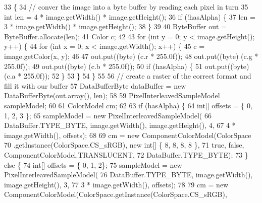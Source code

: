 \begin{DoxyCode}
33                                \{
34         \textcolor{comment}{// conver the image into a byte buffer by reading each pixel in turn}
35         \textcolor{keywordtype}{int} len = 4 * image.getWidth() * image.getHeight();
36         \textcolor{keywordflow}{if} (!hasAlpha) \{
37             len = 3 * image.getWidth() * image.getHeight();
38         \}
39         
40         ByteBuffer out = ByteBuffer.allocate(len);
41         Color c;
42 
43         \textcolor{keywordflow}{for} (\textcolor{keywordtype}{int} y = 0; y < image.getHeight(); y++) \{
44             \textcolor{keywordflow}{for} (\textcolor{keywordtype}{int} x = 0; x < image.getWidth(); x++) \{
45                 c = image.getColor(x, y);
46 
47                 out.put((byte) (c.r * 255.0f));
48                 out.put((byte) (c.g * 255.0f));
49                 out.put((byte) (c.b * 255.0f));
50                 \textcolor{keywordflow}{if} (hasAlpha) \{
51                     out.put((byte) (c.a * 255.0f));
52                 \}
53             \}
54         \}
55 
56         \textcolor{comment}{// create a raster of the correct format and fill it with our buffer}
57         DataBufferByte dataBuffer = \textcolor{keyword}{new} DataBufferByte(out.array(), len);
58         
59         PixelInterleavedSampleModel sampleModel;
60 
61         ColorModel cm;
62         
63         \textcolor{keywordflow}{if} (hasAlpha) \{
64             \textcolor{keywordtype}{int}[] offsets = \{ 0, 1, 2, 3 \};
65             sampleModel = \textcolor{keyword}{new} PixelInterleavedSampleModel(
66                     DataBuffer.TYPE\_BYTE, image.getWidth(), image.getHeight(), 4,
67                     4 * image.getWidth(), offsets);
68             
69             cm = \textcolor{keyword}{new} ComponentColorModel(ColorSpace
70                     .getInstance(ColorSpace.CS\_sRGB), \textcolor{keyword}{new} \textcolor{keywordtype}{int}[] \{ 8, 8, 8, 8 \},
71                     \textcolor{keyword}{true}, \textcolor{keyword}{false}, ComponentColorModel.TRANSLUCENT,
72                     DataBuffer.TYPE\_BYTE);
73         \} \textcolor{keywordflow}{else} \{
74             \textcolor{keywordtype}{int}[] offsets = \{ 0, 1, 2\};
75             sampleModel = \textcolor{keyword}{new} PixelInterleavedSampleModel(
76                     DataBuffer.TYPE\_BYTE, image.getWidth(), image.getHeight(), 3,
77                     3 * image.getWidth(), offsets);
78             
79             cm = \textcolor{keyword}{new} ComponentColorModel(ColorSpace.getInstance(ColorSpace.CS\_sRGB),

\end{DoxyCode}
